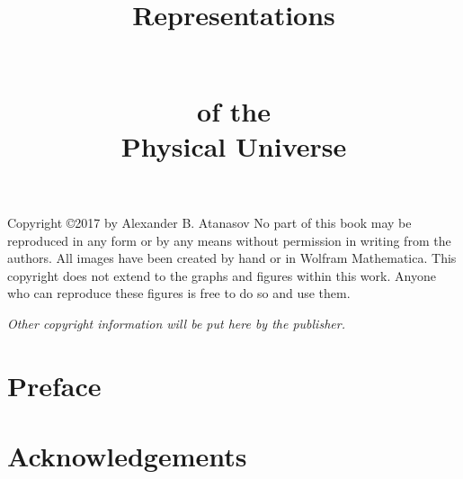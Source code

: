 \documentclass[12pt, twoside, openany]{book}
\title{\begin{titlefont}
	{\fontsize{1.1cm}{1.1cm}\selectfont R}\Huge{epresentations}\end{titlefont}\vspace{.05in}\\
	\textbf{\large of the}\vspace{.05in}\\
	\textbf{\LARGE Physical \LARGE Universe}
}
\begin{document}
\date{}
\maketitle

\listoftodos
\newpage
\thispagestyle{empty}
\setcounter{page}{0}



\vspace*{6cm}

{
	\setlength{\parindent}{-2em}
	Copyright \copyright 2017 by Alexander B. Atanasov
	No part of this book may be reproduced in any form or by any means without permission in writing from the authors. All images have been created by hand or in Wolfram Mathematica. This copyright does not extend to the graphs and figures within this work. Anyone who can reproduce these figures is free to do so and use them. 
	
	\begin{center}
		\vspace*{2cm} \emph{Other copyright information will be put here by the publisher.}
	\end{center}	
}


\chapter*{Preface}\thispagestyle{empty}


\newpage
\thispagestyle{empty}

\begin{center}
\end{center}


\newpage


\tableofcontents


\chapter*{Acknowledgements}\thispagestyle{empty}
\end{document}
